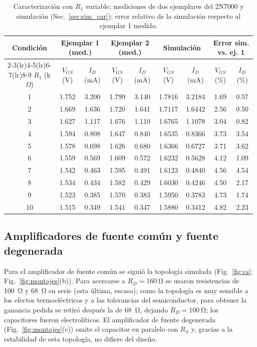 \documentclass[conference]{IEEEtran}
\begin{document}
\begin{table}[htbp]
\centering
\caption{Caracterización con $R_1$ variable: mediciones de dos ejemplares del 2N7000 y simulación (Sec.~\ref{sec:sim_car}); error relativo de la simulación respecto al ejemplar 1 medido.}
\label{tab:car}
\scriptsize
\renewcommand{\arraystretch}{1.03}
\setlength{\tabcolsep}{5pt}
\begin{tabular}{@{}ccccccccc@{}}
\toprule
Condición & \multicolumn{2}{c}{Ejemplar 1 (med.)} & \multicolumn{2}{c}{Ejemplar 2 (med.)} & \multicolumn{2}{c}{Simulación} & \multicolumn{2}{c}{Error sim. vs. ej. 1} \\
\cmidrule(lr){2-3}\cmidrule(lr){4-5}\cmidrule(lr){6-7}\cmidrule(lr){8-9}
$R_1$ (k$\Omega$) & $V_{GS}$ (V) & $I_D$ (mA) & $V_{GS}$ (V) & $I_D$ (mA) & $V_{GS}$ (V) & $I_D$ (mA) & $V_{GS}$ (\%) & $I_D$ (\%) \\
\midrule
1 & 1.752 & 3.200 & 1.799 & 3.140 & 1.7816 & 3.2184 & 1.69 & 0.57 \\
2 & 1.669 & 1.636 & 1.720 & 1.641 & 1.7117 & 1.6442 & 2.56 & 0.50 \\
3 & 1.627 & 1.117 & 1.676 & 1.110 & 1.6765 & 1.1078 & 3.04 & 0.82 \\
4 & 1.594 & 0.808 & 1.647 & 0.840 & 1.6535 & 0.8366 & 3.73 & 3.54 \\
5 & 1.578 & 0.698 & 1.626 & 0.680 & 1.6366 & 0.6727 & 3.71 & 3.62 \\
6 & 1.559 & 0.569 & 1.609 & 0.572 & 1.6232 & 0.5628 & 4.12 & 1.09 \\
7 & 1.542 & 0.463 & 1.595 & 0.491 & 1.6123 & 0.4840 & 4.56 & 4.54 \\
8 & 1.534 & 0.434 & 1.582 & 0.429 & 1.6030 & 0.4246 & 4.50 & 2.17 \\
9 & 1.523 & 0.385 & 1.570 & 0.383 & 1.5950 & 0.3783 & 4.73 & 1.74 \\
10 & 1.515 & 0.349 & 1.541 & 0.347 & 1.5880 & 0.3412 & 4.82 & 2.23 \\
\bottomrule
\end{tabular}
\end{table}

\subsection{Amplificadores de fuente común y fuente degenerada}
\label{sec:mont_fc}
Para el amplificador de fuente común se siguió la topología simulada (Fig.~\ref{fig:cs}; Fig.~\ref{fig:montajes}(b)). Para acercarse a $R_D=\SI{160}{\ohm}$ se usaron resistencias de \SI{100}{\ohm} y \SI{68}{\ohm} en serie (esta última, escasa); como la topología es muy sensible a los efectos termoeléctricos y a las tolerancias del semiconductor, para obtener la ganancia pedida se retiró después la de \SI{68}{\ohm}, dejando $R_D=\SI{100}{\ohm}$; los capacitores fueron electrolíticos. El amplificador de fuente degenerada (Fig.~\ref{fig:montajes}(c)) omite el capacitor en paralelo con $R_S$ y, gracias a la estabilidad de esta topología, no difiere del diseño.
\end{document}
